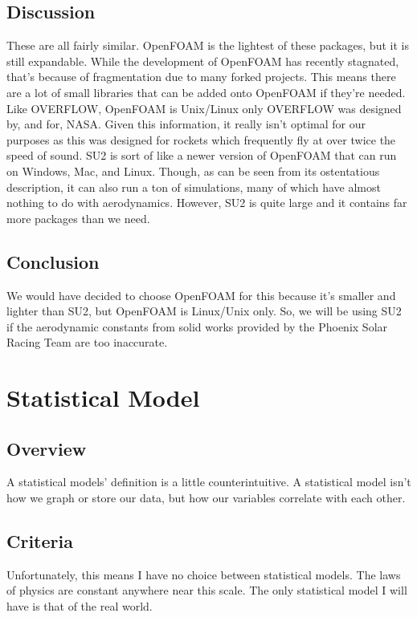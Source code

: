 \documentclass[onecolumn, draftclsnofoot,10pt, compsoc]{IEEEtran}
\begin{document}
\begin{singlespace}
\subsection{Discussion}
These are all fairly similar.
OpenFOAM is the lightest of these packages, but it is still expandable.
While the development of OpenFOAM has recently stagnated, that's because of fragmentation due to many forked projects.
This means there are a lot of small libraries that can be added onto OpenFOAM if they're needed.
Like OVERFLOW, OpenFOAM is Unix/Linux only
OVERFLOW was designed by, and for, NASA.
Given this information, it really isn't optimal for our purposes as this was designed for rockets which frequently fly at over twice the speed of sound.
SU2 is sort of like a newer version of OpenFOAM that can run on Windows, Mac, and Linux.
Though, as can be seen from its ostentatious description, it can also run a ton of simulations, many of which have almost nothing to do with aerodynamics.
However, SU2 is quite large and it contains far more packages than we need.

\subsection{Conclusion}
We would have decided to choose OpenFOAM for this because it's smaller and lighter than SU2, but OpenFOAM is Linux/Unix only.
So, we will be using SU2 if the aerodynamic constants from solid works provided by the Phoenix Solar Racing Team are too inaccurate.


\section{Statistical Model}

\subsection{Overview}
A statistical models' definition is a little counterintuitive.
A statistical model isn't how we graph or store our data, but how our variables correlate with each other.

\subsection{Criteria}
Unfortunately, this means I have no choice between statistical models.
The laws of physics are constant anywhere near this scale.
The only statistical model I will have is that of the real world.



\end{singlespace}
\end{document}
